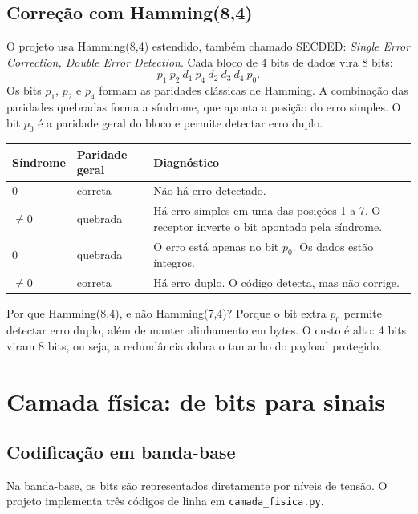 \documentclass[10pt,a4paper]{article}
\newcommand{\arquivo}[1]{\texttt{#1}}
\begin{document}
\subsection{Correção com Hamming(8,4)}

O projeto usa Hamming(8,4) estendido, também chamado SECDED: \textit{Single Error Correction, Double Error Detection}. Cada bloco de 4 bits de dados vira 8 bits:
\[
p_1\ p_2\ d_1\ p_4\ d_2\ d_3\ d_4\ p_0.
\]
Os bits \(p_1\), \(p_2\) e \(p_4\) formam as paridades clássicas de Hamming. A combinação das paridades quebradas forma a síndrome, que aponta a posição do erro simples. O bit \(p_0\) é a paridade geral do bloco e permite detectar erro duplo.

\begin{center}
\small
\begin{tabularx}{\linewidth}{p{2.3cm}p{2.6cm}Y}
\toprule
\textbf{Síndrome} & \textbf{Paridade geral} & \textbf{Diagnóstico} \\
 & correta & Não há erro detectado. \\
\(\ne 0\) & quebrada & Há erro simples em uma das posições 1 a 7. O receptor inverte o bit apontado pela síndrome. \\
0 & quebrada & O erro está apenas no bit \(p_0\). Os dados estão íntegros. \\
\(\ne 0\) & correta & Há erro duplo. O código detecta, mas não corrige. \\
\bottomrule
\end{tabularx}
\end{center}

Por que Hamming(8,4), e não Hamming(7,4)? Porque o bit extra \(p_0\) permite detectar erro duplo, além de manter alinhamento em bytes. O custo é alto: 4 bits viram 8 bits, ou seja, a redundância dobra o tamanho do payload protegido.

\section{Camada física: de bits para sinais}

\subsection{Codificação em banda-base}

Na banda-base, os bits são representados diretamente por níveis de tensão. O projeto implementa três códigos de linha em \arquivo{camada\_fisica.py}.
\end{document}
